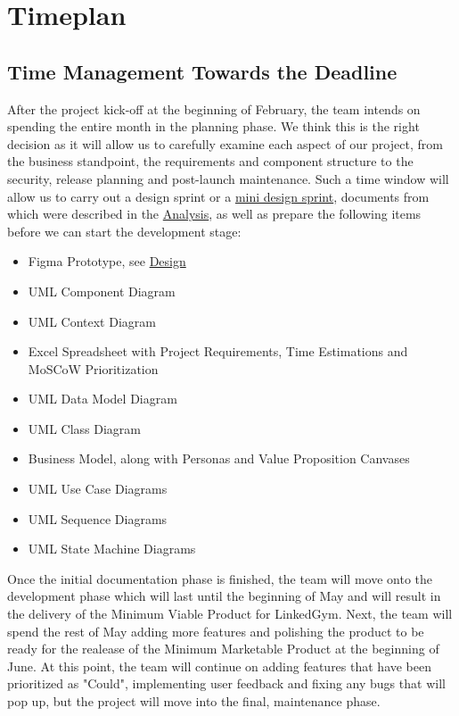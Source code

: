 \section{Timeplan}

\subsection{Time Management Towards the Deadline}

After the project kick-off at the beginning of February, the team intends on spending the entire month in the planning phase. We think
this is the right decision as it will allow us to carefully examine each aspect of our project, from the business standpoint, the requirements
and component structure to the security, release planning and post-launch maintenance. Such a time window will allow us to carry out a design sprint or
a \hyperref[sec:MiniSprint]{mini design sprint}, documents from which were described in 
the \hyperref[sec:UserJourneyMaps]{Analysis}, as well as prepare the following items before we can start the development stage:
\begin{itemize}
    \item Figma Prototype, see \hyperref[sec:Design]{Design}
    \item UML Component Diagram
    \item UML Context Diagram
    \item Excel Spreadsheet with Project Requirements, Time Estimations and MoSCoW Prioritization
    \item UML Data Model Diagram
    \item UML Class Diagram
    \item Business Model, along with Personas and Value Proposition Canvases
    \item UML Use Case Diagrams
    \item UML Sequence Diagrams
    \item UML State Machine Diagrams
\end{itemize}

Once the initial documentation phase is finished, the team will move onto the development phase which will last until the beginning
of May and will result in the delivery of the Minimum Viable Product for LinkedGym. Next, the team will spend the rest of May adding more features and polishing
the product to be ready for the realease of the Minimum Marketable Product at the beginning of June. At this point, the team will continue on adding features 
that have been prioritized as "Could", implementing user feedback and fixing any bugs that will pop up, but the project will move into the final, maintenance phase.

